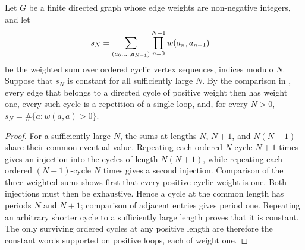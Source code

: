 \begin{lemma}
    \label{thm:beigi_eventually_constant_sector_graph}
    \leanok
    Let $G$ be a finite directed graph whose edge weights are non-negative
    integers, and let
    \begin{align}
        s_N
         & =
        \sum_{(a_0,\ldots,a_{N-1})}
        \prod_{n=0}^{N-1}w(a_n,a_{n+1}) \notag
    \end{align}
    be the weighted sum over ordered cyclic vertex sequences, indices modulo
    $N$. Suppose that $s_N$ is constant for all sufficiently large $N$. By
    the comparison in \cite[Section~IV]{Beigi2012Classification}, every edge
    that belongs to a directed cycle of positive weight then has weight one,
    every such cycle is a repetition of a single loop, and, for every $N>0$,
    $s_N=\#\{a:w(a,a)>0\}$.
\end{lemma}

\begin{proof}
    \leanok
    For a sufficiently large $N$, the sums at lengths $N$,
    $N+1$, and $N(N+1)$ share their common eventual value. Repeating each
    ordered $N$-cycle $N+1$ times gives an injection into the cycles of length
    $N(N+1)$, while repeating each ordered $(N+1)$-cycle $N$ times gives a
    second injection. Comparison of the three weighted sums shows first that
    every positive cyclic weight is one. Both injections must then be
    exhaustive. Hence a cycle at the common length has periods $N$ and
    $N+1$; comparison of adjacent entries gives period one. Repeating an
    arbitrary shorter cycle to a sufficiently large length proves that it is
    constant. The only surviving ordered cycles at any positive length are
    therefore the constant words supported on positive loops, each of weight
    one.
\end{proof}

